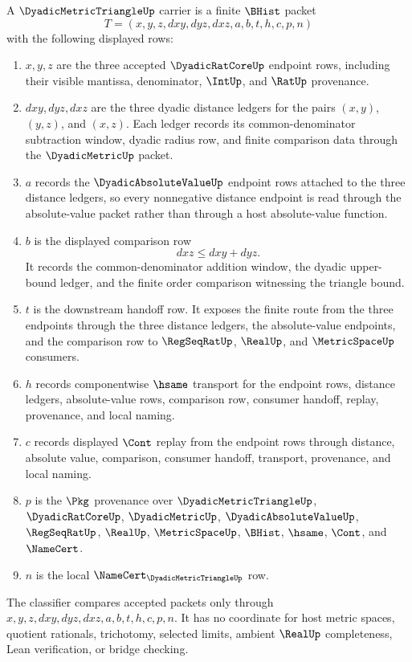 \begin{definition}
\label{def:dyadic-metric-triangle-carrier}
A $\DyadicMetricTriangleUp$ carrier is a finite $\BHist$ packet
$$
T=(x,y,z,dxy,dyz,dxz,a,b,t,h,c,p,n)
$$
with the following displayed rows:
\begin{enumerate}
\item $x,y,z$ are the three accepted $\DyadicRatCoreUp$ endpoint rows, including their visible mantissa, denominator, $\IntUp$, and $\RatUp$ provenance.
\item $dxy,dyz,dxz$ are the three dyadic distance ledgers for the pairs $(x,y)$, $(y,z)$, and $(x,z)$. Each ledger records its common-denominator subtraction window, dyadic radius row, and finite comparison data through the $\DyadicMetricUp$ packet.
\item $a$ records the $\DyadicAbsoluteValueUp$ endpoint rows attached to the three distance ledgers, so every nonnegative distance endpoint is read through the absolute-value packet rather than through a host absolute-value function.
\item $b$ is the displayed comparison row
$$
dxz \leq dxy + dyz .
$$
It records the common-denominator addition window, the dyadic upper-bound ledger, and the finite order comparison witnessing the triangle bound.
\item $t$ is the downstream handoff row. It exposes the finite route from the three endpoints through the three distance ledgers, the absolute-value endpoints, and the comparison row to $\RegSeqRatUp$, $\RealUp$, and $\MetricSpaceUp$ consumers.
\item $h$ records componentwise $\hsame$ transport for the endpoint rows, distance ledgers, absolute-value rows, comparison row, consumer handoff, replay, provenance, and local naming.
\item $c$ records displayed $\Cont$ replay from the endpoint rows through distance, absolute value, comparison, consumer handoff, transport, provenance, and local naming.
\item $p$ is the $\Pkg$ provenance over $\DyadicMetricTriangleUp$, $\DyadicRatCoreUp$, $\DyadicMetricUp$, $\DyadicAbsoluteValueUp$, $\RegSeqRatUp$, $\RealUp$, $\MetricSpaceUp$, $\BHist$, $\hsame$, $\Cont$, and $\NameCert$.
\item $n$ is the local $\NameCert_{\DyadicMetricTriangleUp}$ row.
\end{enumerate}
The classifier compares accepted packets only through $x,y,z,dxy,dyz,dxz,a,b,t,h,c,p,n$. It has no coordinate for host metric spaces, quotient rationals, trichotomy, selected limits, ambient $\RealUp$ completeness, Lean verification, or bridge checking.
\end{definition}

